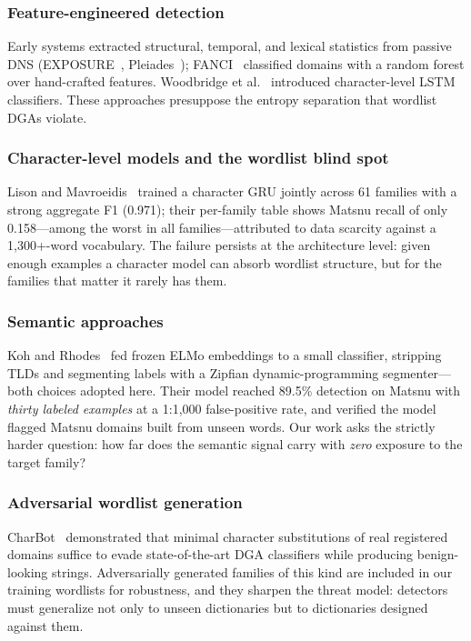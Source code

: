 \documentclass[conference]{IEEEtran}
\begin{document}
\subsubsection*{Feature-engineered detection}
Early systems extracted structural, temporal, and lexical statistics from passive DNS (EXPOSURE~\cite{bilge2011}, Pleiades~\cite{antonakakis2012}); FANCI~\cite{schuppen2018} classified domains with a random forest over hand-crafted features. Woodbridge et al.~\cite{woodbridge2016} introduced character-level LSTM classifiers. These approaches presuppose the entropy separation that wordlist DGAs violate.

\subsubsection*{Character-level models and the wordlist blind spot}
Lison and Mavroeidis~\cite{lison2017} trained a character GRU jointly across 61 families with a strong aggregate F1 (0.971); their per-family table shows Matsnu recall of only 0.158---among the worst in all families---attributed to data scarcity against a 1,300+-word vocabulary. The failure persists at the architecture level: given enough examples a character model can absorb wordlist structure, but for the families that matter it rarely has them.

\subsubsection*{Semantic approaches}
Koh and Rhodes~\cite{koh2018} fed frozen ELMo embeddings to a small classifier, stripping TLDs and segmenting labels with a Zipfian dynamic-programming segmenter---both choices adopted here. Their model reached 89.5\% detection on Matsnu with \emph{thirty labeled examples} at a 1:1,000 false-positive rate, and verified the model flagged Matsnu domains built from unseen words. Our work asks the strictly harder question: how far does the semantic signal carry with \emph{zero} exposure to the target family?

\subsubsection*{Adversarial wordlist generation}
CharBot~\cite{peck2019} demonstrated that minimal character substitutions of real registered domains suffice to evade state-of-the-art DGA classifiers while producing benign-looking strings. Adversarially generated families of this kind are included in our training wordlists for robustness, and they sharpen the threat model: detectors must generalize not only to unseen dictionaries but to dictionaries designed against them.
\end{document}
